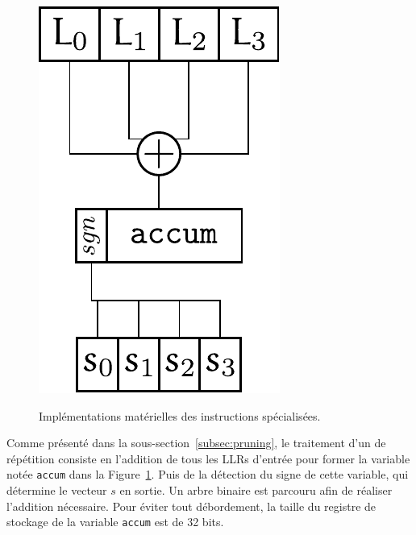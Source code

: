\begin{figure}[t]
{  \includegraphics[scale=0.45]{main/ch3_fig/rep_tie}
  \label{fig:rep_tie}
  } \quad\quad\quad\quad\quad\quad\quad\quad\quad\quad
  \caption{Implémentations matérielles des instructions spécialisées.}
\end{figure}

Comme présenté dans la sous-section~\ref{subsec:pruning}, le traitement d'un \noeud de répétition consiste en l'addition de tous les LLRs d'entrée pour former la variable notée \og \texttt{accum} \fg dans la Figure~\ref{fig:rep_tie}. Puis de la détection du signe de cette variable, qui détermine le vecteur $s$ en sortie. Un arbre binaire est parcouru afin de réaliser l'addition nécessaire. Pour éviter tout débordement, la taille du registre de stockage de la variable \texttt{accum} est de 32 bits.

